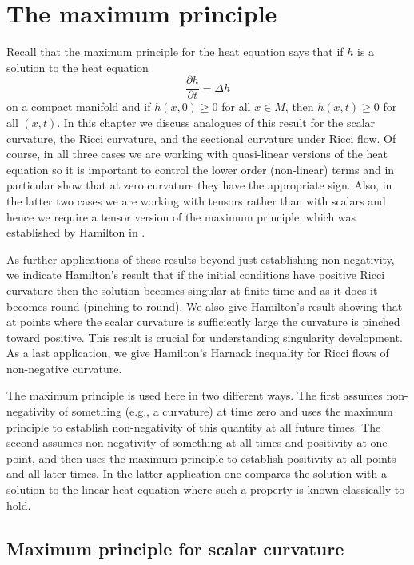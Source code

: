 \chapter{The maximum principle}
\label{chap:maximum-principle}
\label{secmaxprin}
 Recall that the maximum principle for the heat equation says that if $h$ is a  solution to
the heat equation $$\frac{\partial h}{\partial t}=\Delta h$$ on a
compact manifold and if $h(x,0)\ge 0$ for all $x\in M$, then
$h(x,t)\ge 0$ for all $(x,t)$. In this chapter we discuss analogues
of this result for the scalar curvature, the Ricci curvature, and
the sectional curvature under Ricci flow. Of course, in all three
cases we are working with quasi-linear versions of the heat equation
so it is important to control the lower order (non-linear) terms and
in particular show that at zero curvature they have the appropriate
sign. Also, in the latter two cases we are working with tensors
rather than with scalars and hence we require a tensor version of
the maximum principle, which was established by Hamilton in
\cite{Hamilton4MPIC}.

As further applications of these results beyond just establishing
non-negativity, we indicate Hamilton's result that if the initial
conditions have positive Ricci curvature then the solution becomes
singular at finite time and as it does it becomes round (pinching to
round). We also give Hamilton's result showing that at points where
the scalar curvature is sufficiently large the curvature is pinched
toward positive. This result is crucial for understanding
singularity development. As a last application, we give Hamilton's
Harnack inequality for Ricci flows of non-negative curvature.


The maximum principle is used here in two different ways. The first
assumes non-negativity of something (e.g., a curvature) at time zero
and uses the maximum principle to establish non-negativity of this
quantity at all future times. The second assumes non-negativity of
something at all times and positivity at one point, and then uses
the maximum principle to establish positivity at all points and all
later times. In the latter application one compares the solution
with a solution to the linear heat equation where such a property is
known classically to hold.


\section{Maximum principle for scalar curvature}

